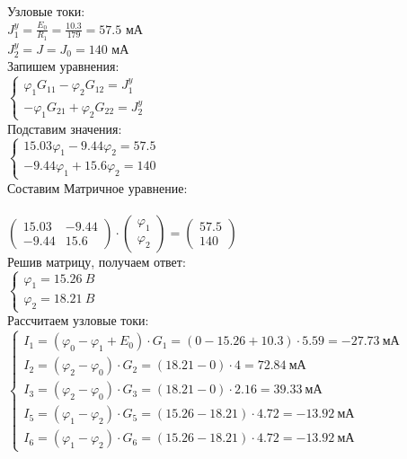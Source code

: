 Узловые токи:
\\
$J^y_1 = \frac{E_0}{R_1} = \frac{10.3}{179} = 57.5$ мА
\\
$J^y_2 = J = J_0 = 140$ мА
\\

Запишем уравнения:
\\
$
\begin{cases}
\varphi_1G_{11} - \varphi_2G_{12} = J^y_1
\\
-\varphi_1G_{21} + \varphi_2G_{22} = J^y_2
\end{cases}
$
\\

Подставим значения:
\\
$
\begin{cases}
15.03\varphi_1 - 9.44\varphi_2 = 57.5
\\
-9.44\varphi_1 + 15.6\varphi_2 = 140
\end{cases}
$
\\

Составим Матричное уравнение:
\\
\\
$
\begin{pmatrix}
    15.03 & -9.44\\
    -9.44 & 15.6 
\end{pmatrix}
\cdot
\begin{pmatrix}
    \varphi_1 \\
    \varphi_2
\end{pmatrix}
=
\begin{pmatrix}
    57.5 \\
    140
\end{pmatrix}
$
\\

Решив матрицу, получаем ответ:
\\
$\begin{cases}
\varphi_1 = 15.26~B
\\
\varphi_2 = 18.21~B
\end{cases}$
\\

Рассчитаем узловые токи:
\\
$\begin{cases}
I_1 = (\varphi_0 - \varphi_1 + E_0) \cdot G_1 = (0 - 15.26 + 10.3) \cdot 5.59 = -27.73 ~\text{мА}
\\
I_2 = (\varphi_2 - \varphi_0) \cdot G_2 = (18.21 - 0 ) \cdot 4 = 72.84 ~\text{мА}
\\
I_3 = (\varphi_2 - \varphi_0) \cdot G_3 = (18.21 - 0 ) \cdot 2.16 = 39.33 ~\text{мА}
\\
I_5 = (\varphi_1 - \varphi_2) \cdot G_5 = (15.26 - 18.21) \cdot 4.72 = -13.92 ~\text{мА}
\\
I_6 = (\varphi_1 - \varphi_2) \cdot G_6 = (15.26 - 18.21) \cdot 4.72 = -13.92 ~\text{мА}
\end{cases}$

